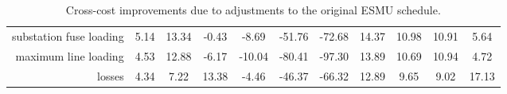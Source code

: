 \begin{sidewaystable}
\begin{tabular}{cc|ccccccccc|}
\multicolumn{1}{r|}{substation fuse loading} & \cellcolor{light_blue}5.14 & \cellcolor{light_blue}13.34 & -0.43 & -8.69 & -51.76 & -72.68 & \cellcolor{light_blue}14.37 & \cellcolor{light_blue}10.98 & \cellcolor{light_blue}10.91 & \cellcolor{light_blue}5.64 \\
\multicolumn{1}{r|}{maximum line loading} & \cellcolor{light_blue}4.53 & \cellcolor{light_blue}12.88 & -6.17 & -10.04 & -80.41 & -97.30 & \cellcolor{light_blue}13.89 & \cellcolor{light_blue}10.69 & \cellcolor{light_blue}10.94 & \cellcolor{light_blue}4.72 \\
\multicolumn{1}{r|}{losses} & \cellcolor{light_blue}4.34 & \cellcolor{light_blue}7.22 & \cellcolor{light_blue}13.38 & -4.46 & -46.37 & -66.32 & \cellcolor{light_blue}12.89 & \cellcolor{light_blue}9.65 & \cellcolor{light_blue}9.02 & \cellcolor{light_blue}17.13 \\
\end{tabular}
\caption{Cross-cost improvements due to adjustments to the original ESMU schedule.}
\label{ch1:tab:cost-table}
\end{sidewaystable}
